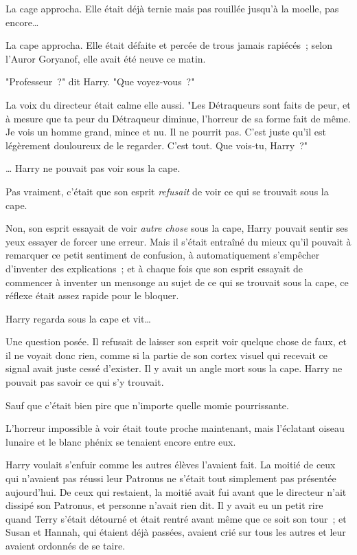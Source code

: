 La cage approcha. Elle était déjà ternie mais pas rouillée jusqu'à la moelle, pas encore…

La cape approcha. Elle était défaite et percée de trous jamais rapiécés~; selon l'Auror Goryanof, elle avait été neuve ce matin.

"Professeur~?" dit Harry. "Que voyez-vous~?"

La voix du directeur était calme elle aussi. "Les Détraqueurs sont faits de peur, et à mesure que ta peur du Détraqueur diminue, l'horreur de sa forme fait de même. Je vois un homme grand, mince et nu. Il ne pourrit pas. C'est juste qu'il est légèrement douloureux de le regarder. C'est tout. Que vois-tu, Harry~?"

… Harry ne pouvait pas voir sous la cape.

Pas vraiment, c'était que son esprit \emph{refusait} de voir ce qui se trouvait sous la cape.

Non, son esprit essayait de voir \emph{autre chose} sous la cape, Harry pouvait sentir ses yeux essayer de forcer une erreur. Mais il s'était entraîné du mieux qu'il pouvait à remarquer ce petit sentiment de confusion, à automatiquement s'empêcher d'inventer des explications~; et à chaque fois que son esprit essayait de commencer à inventer un mensonge au sujet de ce qui se trouvait sous la cape, ce réflexe était assez rapide pour le bloquer.

Harry regarda sous la cape et vit…

Une question posée. Il refusait de laisser son esprit voir quelque chose de faux, et il ne voyait donc rien, comme si la partie de son cortex visuel qui recevait ce signal avait juste cessé d'exister. Il y avait un angle mort sous la cape. Harry ne pouvait pas savoir ce qui s'y trouvait.

Sauf que c'était bien pire que n'importe quelle momie pourrissante.

L'horreur impossible à voir était toute proche maintenant, mais l'éclatant oiseau lunaire et le blanc phénix se tenaient encore entre eux.

Harry voulait s'enfuir comme les autres élèves l'avaient fait. La moitié de ceux qui n'avaient pas réussi leur Patronus ne s'était tout simplement pas présentée aujourd'hui. De ceux qui restaient, la moitié avait fui avant que le directeur n'ait dissipé son Patronus, et personne n'avait rien dit. Il y avait eu un petit rire quand Terry s'était détourné et était rentré avant même que ce soit son tour~; et Susan et Hannah, qui étaient déjà passées, avaient crié sur tous les autres et leur avaient ordonnés de se taire.

